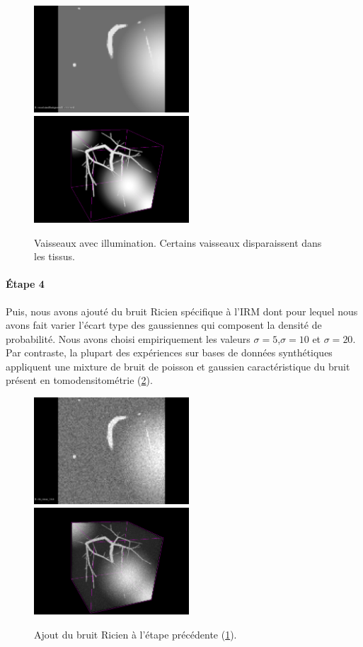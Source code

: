 \begin{figure}[h]
  \centering
  \includegraphics[height=4cm]{Images/2D_VBI.png}
  \includegraphics[height=4cm]{Images/3D_VBI.png}
  
  \caption{Vaisseaux avec illumination. Certains vaisseaux disparaissent dans les tissus.}
  \label{fig:VBI}
\end{figure}

\paragraph{Étape 4}
Puis, nous avons ajouté du bruit Ricien spécifique à l'IRM dont pour lequel nous avons fait varier l'écart type des gaussiennes qui composent la densité de probabilité. Nous avons choisi empiriquement les valeurs $\sigma=5$,$\sigma=10$ et $\sigma=20$. Par contraste, la plupart des expériences sur bases de données synthétiques appliquent une mixture de bruit de poisson et gaussien caractéristique du bruit présent en tomodensitométrie (\ref{fig:VBIR}).

\begin{figure}[h]
  \centering
  \includegraphics[height=4cm]{Images/2D_VBIR10.png}
  \includegraphics[height=4cm]{Images/3D_VBIR10.png}
  
  \caption{Ajout du bruit Ricien à l'étape précédente (\ref{fig:VBI}).}
  \label{fig:VBIR}
\end{figure}

